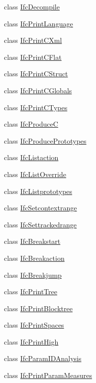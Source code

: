 \begin{DoxyCompactItemize}
class \mbox{\hyperlink{class_ifc_decompile}{Ifc\+Decompile}}
\item 
class \mbox{\hyperlink{class_ifc_print_language}{Ifc\+Print\+Language}}
\item 
class \mbox{\hyperlink{class_ifc_print_c_xml}{Ifc\+Print\+C\+Xml}}
\item 
class \mbox{\hyperlink{class_ifc_print_c_flat}{Ifc\+Print\+C\+Flat}}
\item 
class \mbox{\hyperlink{class_ifc_print_c_struct}{Ifc\+Print\+C\+Struct}}
\item 
class \mbox{\hyperlink{class_ifc_print_c_globals}{Ifc\+Print\+C\+Globals}}
\item 
class \mbox{\hyperlink{class_ifc_print_c_types}{Ifc\+Print\+C\+Types}}
\item 
class \mbox{\hyperlink{class_ifc_produce_c}{Ifc\+ProduceC}}
\item 
class \mbox{\hyperlink{class_ifc_produce_prototypes}{Ifc\+Produce\+Prototypes}}
\item 
class \mbox{\hyperlink{class_ifc_listaction}{Ifc\+Listaction}}
\item 
class \mbox{\hyperlink{class_ifc_list_override}{Ifc\+List\+Override}}
\item 
class \mbox{\hyperlink{class_ifc_listprototypes}{Ifc\+Listprototypes}}
\item 
class \mbox{\hyperlink{class_ifc_setcontextrange}{Ifc\+Setcontextrange}}
\item 
class \mbox{\hyperlink{class_ifc_settrackedrange}{Ifc\+Settrackedrange}}
\item 
class \mbox{\hyperlink{class_ifc_breakstart}{Ifc\+Breakstart}}
\item 
class \mbox{\hyperlink{class_ifc_breakaction}{Ifc\+Breakaction}}
\item 
class \mbox{\hyperlink{class_ifc_breakjump}{Ifc\+Breakjump}}
\item 
class \mbox{\hyperlink{class_ifc_print_tree}{Ifc\+Print\+Tree}}
\item 
class \mbox{\hyperlink{class_ifc_print_blocktree}{Ifc\+Print\+Blocktree}}
\item 
class \mbox{\hyperlink{class_ifc_print_spaces}{Ifc\+Print\+Spaces}}
\item 
class \mbox{\hyperlink{class_ifc_print_high}{Ifc\+Print\+High}}
\item 
class \mbox{\hyperlink{class_ifc_param_i_d_analysis}{Ifc\+Param\+I\+D\+Analysis}}
\item 
class \mbox{\hyperlink{class_ifc_print_param_measures}{Ifc\+Print\+Param\+Measures}}

\end{DoxyCompactItemize}
